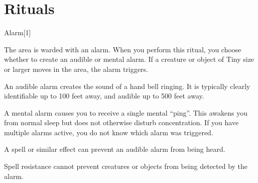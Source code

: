 \section{Rituals}

\small

\begin{spellsection}{Alarm}[1]
    \begin{spellheader}
    \end{spellheader}
    \begin{spellcontent}
        \begin{spelltargetinginfo}
        \end{spelltargetinginfo}
        \begin{spelleffects}
            \spelleffect The area is warded with an alarm. When you perform this ritual, you choose whether to create an audible or mental alarm. If a creature or object of Tiny size or larger moves in the area, the alarm triggers.

            An audible alarm creates the sound of a hand bell ringing. It is typically clearly identifiable up to 100 feet away, and audible up to 500 feet away.

            A mental alarm causes you to receive a single mental ``ping''. This awakens you from normal sleep but does not otherwise disturb concentration. If you have multiple alarms active, you do not know which alarm was triggered.
            \spelldur \durext \dismissable
        \end{spelleffects}
    \end{spellcontent}
    \begin{spellfooter}
        \spellnotes A  spell or similar effect can prevent an audible alarm from being heard.

        Spell resistance cannot prevent creatures or objects from being detected by the alarm.
    \end{spellfooter}
    \begin{spellaugments}
    \end{spellaugments}
\end{spellsection}

